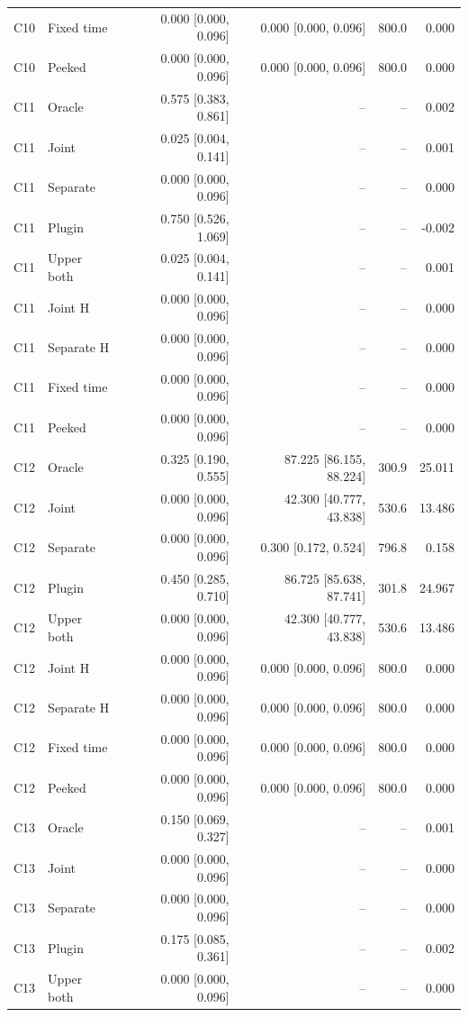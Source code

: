 \begin{longtable}{llrrrr}
C10 & Fixed time & 0.000 [0.000, 0.096] & 0.000 [0.000, 0.096] & 800.0 & 0.000\\
C10 & Peeked & 0.000 [0.000, 0.096] & 0.000 [0.000, 0.096] & 800.0 & 0.000\\
C11 & Oracle & 0.575 [0.383, 0.861] & -- & -- & 0.002\\
C11 & Joint & 0.025 [0.004, 0.141] & -- & -- & 0.001\\
C11 & Separate & 0.000 [0.000, 0.096] & -- & -- & 0.000\\
C11 & Plugin & 0.750 [0.526, 1.069] & -- & -- & -0.002\\
C11 & Upper both & 0.025 [0.004, 0.141] & -- & -- & 0.001\\
C11 & Joint H & 0.000 [0.000, 0.096] & -- & -- & 0.000\\
C11 & Separate H & 0.000 [0.000, 0.096] & -- & -- & 0.000\\
C11 & Fixed time & 0.000 [0.000, 0.096] & -- & -- & 0.000\\
C11 & Peeked & 0.000 [0.000, 0.096] & -- & -- & 0.000\\
C12 & Oracle & 0.325 [0.190, 0.555] & 87.225 [86.155, 88.224] & 300.9 & 25.011\\
C12 & Joint & 0.000 [0.000, 0.096] & 42.300 [40.777, 43.838] & 530.6 & 13.486\\
C12 & Separate & 0.000 [0.000, 0.096] & 0.300 [0.172, 0.524] & 796.8 & 0.158\\
C12 & Plugin & 0.450 [0.285, 0.710] & 86.725 [85.638, 87.741] & 301.8 & 24.967\\
C12 & Upper both & 0.000 [0.000, 0.096] & 42.300 [40.777, 43.838] & 530.6 & 13.486\\
C12 & Joint H & 0.000 [0.000, 0.096] & 0.000 [0.000, 0.096] & 800.0 & 0.000\\
C12 & Separate H & 0.000 [0.000, 0.096] & 0.000 [0.000, 0.096] & 800.0 & 0.000\\
C12 & Fixed time & 0.000 [0.000, 0.096] & 0.000 [0.000, 0.096] & 800.0 & 0.000\\
C12 & Peeked & 0.000 [0.000, 0.096] & 0.000 [0.000, 0.096] & 800.0 & 0.000\\
C13 & Oracle & 0.150 [0.069, 0.327] & -- & -- & 0.001\\
C13 & Joint & 0.000 [0.000, 0.096] & -- & -- & 0.000\\
C13 & Separate & 0.000 [0.000, 0.096] & -- & -- & 0.000\\
C13 & Plugin & 0.175 [0.085, 0.361] & -- & -- & 0.002\\
C13 & Upper both & 0.000 [0.000, 0.096] & -- & -- & 0.000\\

\end{longtable}
